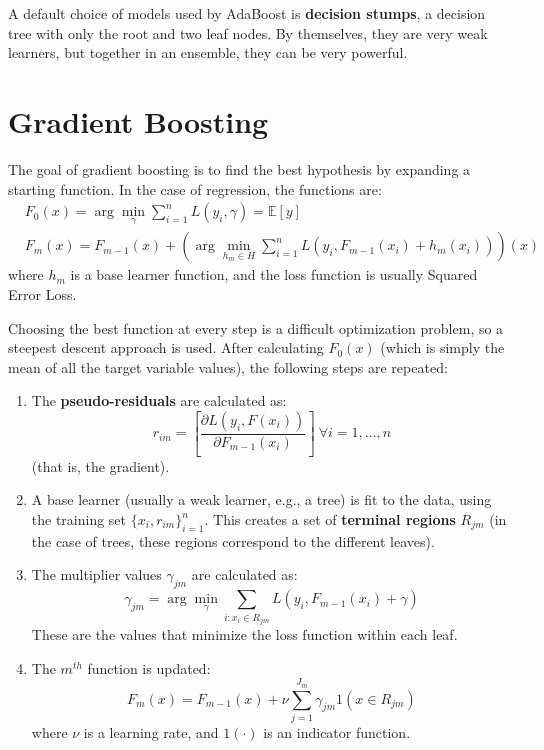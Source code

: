 A default choice of models used by AdaBoost is \textbf{decision stumps}, a decision tree with only the root and two leaf nodes. By themselves, they are very weak learners, but together in an ensemble, they can be very powerful.

\section{Gradient Boosting}

The goal of gradient boosting is to find the best hypothesis by expanding a starting function. In the case of regression, the functions are:
\begin{align*}
    &F_0(x) = \arg \min_{\gamma} \sum_{i=1}^n L(y_i, \gamma) = \mathbb{E}[y] \\
    &F_m(x) = F_{m-1}(x) + \left ( \arg \min_{h_m \in H} \sum_{i=1}^n L(y_i, F_{m-1}(x_i) + h_m(x_i)) \right ) (x)
\end{align*}
where $h_m$ is a base learner function, and the loss function is usually Squared Error Loss.

Choosing the best function at every step is a difficult optimization problem, so a steepest descent approach is used. After calculating $F_0(x)$ (which is simply the mean of all the target variable values), the following steps are repeated:
\begin{enumerate}
    \item The \textbf{pseudo-residuals} are calculated as:
    \begin{equation*}
        r_{im} = \left [ \dfrac{\partial L(y_i, F(x_i))}{\partial F_{m-1}(x_i)} \right ] \ \forall i = 1, \dots, n
    \end{equation*}
    (that is, the gradient).

    \item A base learner (usually a weak learner, e.g., a tree) is fit to the data, using the training set $\{x_i, r_{im}\}_{i=1}^n$. This creates a set of \textbf{terminal regions} $R_{jm}$ (in the case of trees, these regions correspond to the different leaves).

    \item The multiplier values $\gamma_{jm}$ are calculated as:
    \begin{equation*}
        \gamma_{jm} = \arg \min_{\gamma} \sum_{i:x_i \in R_{jm}} L(y_i, F_{m-1}(x_i) + \gamma)
    \end{equation*}
    These are the values that minimize the loss function within each leaf.

    \item The $m^{th}$ function is updated:
    \begin{equation*}
        F_m(x) = F_{m-1}(x) + \nu \sum_{j=1}^{J_m} \gamma_{jm} 1(x \in R_{jm}) 
    \end{equation*}
    where $\nu$ is a learning rate, and $1(\cdot)$ is an indicator function.
\end{enumerate}

